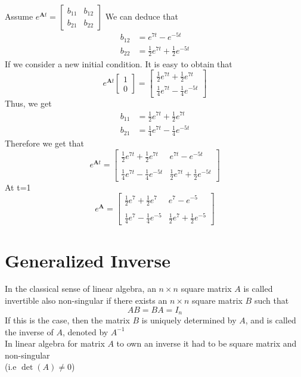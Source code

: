 Assume $ e^{\mathbf{A} t} = \begin{bmatrix}
        b_{11} & b_{12} \\
        b_{21} & b_{22}
    \end{bmatrix}
$
We can deduce that
\begin{align*}
    b_{12} & = e^{7t} - e^{-5t}                       
    \\
    b_{22} & = \frac{1}{2}e^{7t} +\frac{1}{2} e^{-5t} 
\end{align*}
If we consider a new initial condition. It is easy to obtain that
\[
    e^{\mathbf{A} t}
    \begin{bmatrix}
        1 \\
        0
    \end{bmatrix}=\begin{bmatrix}
        \frac{1}{2}e^{7t} + \frac{1}{2}e^{7t} \\
        \frac{1}{4}e^{7t} - \frac{1}{4}e^{-5t}
    \end{bmatrix}    
\]
Thus, we get
\begin{align*}
    b_{11} & = \frac{1}{2}e^{7t} + \frac{1}{2}e^{7t}  \\
    b_{21} & = \frac{1}{4}e^{7t} - \frac{1}{4}e^{-5t}
\end{align*}
Therefore we get that 
\[
    e^{\mathbf{A}t} =
    \begin{bmatrix}
        \displaystyle \frac{1}{2}e^{7t} + \frac{1}{2}e^{7t}  & e^{7t} - e^{-5t}                       
        \\\\
        \displaystyle \frac{1}{4}e^{7t} - \frac{1}{4}e^{-5t} & \frac{1}{2}e^{7t} +\frac{1}{2} e^{-5t}
    \end{bmatrix}    
\]
At t=1
\[
    e^{\mathbf{A}} =
    \begin{bmatrix}
        \displaystyle \frac{1}{2}e^{7} + \frac{1}{2}e^{7}  & e^{7} - e^{-5}                       
        \\\\
        \displaystyle \frac{1}{4}e^{7} - \frac{1}{4}e^{-5} & \frac{1}{2}e^{7} +\frac{1}{2} e^{-5}
    \end{bmatrix}    
\]

\newpage

\section{Generalized Inverse}

In the classical sense of linear algebra, an $n \times n$ square matrix $A$ is 
called invertible also non-singular 
if there exists an $n \times n$ square matrix $B$ such that
\[
AB = BA = I_n        
\]
If this is the case, then the matrix $B$ is 
uniquely determined by $A$, and is called the 
inverse of $A$, denoted by $A^{-1}$
\\
In linear algebra for matrix $A$ to own an inverse 
it had to be square matrix and non-singular \\ (i.e $\det(A)\neq0$)
